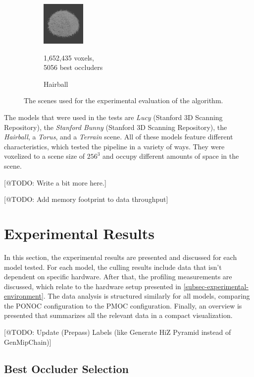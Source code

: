 \begin{figure}[!htb]
\begin{subfigure}{80px}
  \end{subfigure}
  \begin{subfigure}{80px}
      \includegraphics[width=80px]{images/graphics/model-hairball.jpg}
      \caption{Hairball}
      \parbox{\linewidth}{\centering\footnotesize 1,652,435 voxels,\\ 5056 best occluders}
  \end{subfigure}
  
  \caption{The scenes used for the experimental evaluation of the algorithm.}
  \label{fig:experiment-models}
\end{figure}


\noindent
The models that were used in the tests are \emph{Lucy} (Stanford 3D Scanning Repository), the 
\emph{Stanford Bunny} (Stanford 3D Scanning Repository), the \emph{Hairball}, a \emph{Torus}, 
and a \emph{Terrain} scene. All of these models feature different characteristics, which tested 
the pipeline in a variety of ways. They were voxelized to a scene size of $256^3$ and occupy 
different amounts of space in the scene.

[@TODO: Write a bit more here.]



[@TODO: Add memory footprint to data throughput]


\section{Experimental Results}

In this section, the experimental results are presented and discussed for each model tested.
For each model, the culling results include data that isn't dependent on specific hardware. 
After that, the profiling measurements are discussed, which relate to the hardware setup presented 
in \ref{subsec-experimental-environment}. The data analysis is structured similarly for all models,
comparing the \ac{PONOC} configuration to the \ac{PMOC} configuration. Finally, an overview 
is presented that summarizes all the relevant data in a compact visualization.

[@TODO: Update (Prepass) Labels (like Generate HiZ Pyramid instead of GenMipChain)]

\subsection*{Best Occluder Selection}

